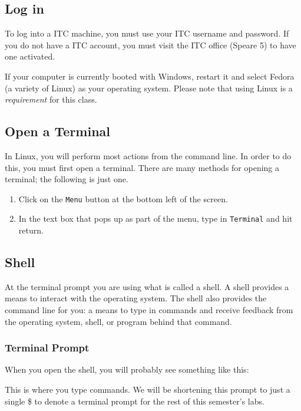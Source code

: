 \documentclass[11pt]{cselabheader}
\begin{document}
\subsection{Log in}
To log into a ITC machine, you must use your ITC username and password. If you
do not have a ITC account, you must visit the ITC office (Speare 5) to have one
activated.

If your computer is currently booted with Windows, restart it and select Fedora
(a variety of Linux) as your operating system. Please note that using Linux is a
\emph{requirement} for this class.

\subsection{Open a Terminal}
In Linux, you will perform most actions from the command line. In order to do
this, you must first open a terminal. There are many methods for opening a
terminal; the following is just one.

\begin{enumerate}
  \item Click on the \texttt{Menu} button at the bottom left of the screen.
  \item In the text box that pops up as part of the menu, type in
    \texttt{Terminal} and hit return.
\end{enumerate}


\subsection{Shell}
At the terminal prompt you are using what is called a shell. A shell
provides a means to interact with the operating system. The shell also provides
the command line for you: a means to type in commands and receive feedback from
the operating system, shell, or program behind that command.

\subsubsection{Terminal Prompt}

When you open the shell, you will probably see something like this:


This is where you type commands. We will be shortening this prompt to just a
single \$ to denote a terminal prompt for the rest of this semester's labs.
\end{document}
